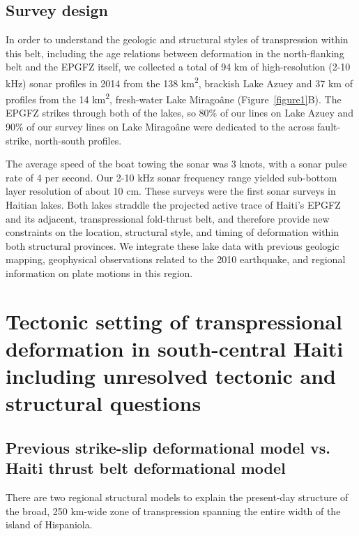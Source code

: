 \documentclass[linenumbers,draft]{agujournal}
\begin{document}
\subsection{Survey design}
In order to understand the geologic and structural styles of transpression within this belt, including the age relations between deformation in the north-flanking belt and the EPGFZ itself, we collected a total of 94 km of high-resolution (2-10 kHz) sonar profiles in 2014 from the 138 km\textsuperscript{2}, brackish Lake Azuey and 37 km of profiles from the 14 km\textsuperscript{2}, fresh-water Lake Mirago\^ane (Figure~\ref{figure1}B). The EPGFZ strikes through both of the lakes, so 80\% of our lines on Lake Azuey and 90\% of our survey lines on Lake Mirago\^ane were dedicated to the across fault-strike, north-south profiles. 

The average speed of the boat towing the sonar was 3 knots, with a sonar pulse rate of 4 per second. Our 2-10 kHz sonar frequency range yielded sub-bottom layer resolution of about 10 cm. These surveys were the first sonar surveys in Haitian lakes. Both lakes straddle the projected active trace of Haiti's EPGFZ and its adjacent, transpressional fold-thrust belt, and therefore provide new constraints on the location, structural style, and timing of deformation within both structural provinces. We integrate these lake data with previous geologic mapping, geophysical observations related to the 2010 earthquake, and regional information on plate motions in this region. 

\section{Tectonic setting of transpressional deformation in south-central Haiti including unresolved tectonic and structural questions}
\label{sec:tectonic}
\subsection{Previous strike-slip deformational model vs. Haiti thrust belt deformational model}
There are two regional structural models to explain the present-day structure of the broad, 250 km-wide zone of transpression spanning the entire width of the island of Hispaniola.
\end{document}
